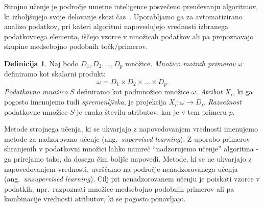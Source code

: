 \documentclass[12pt,a4paper,twoside]{article}
\theoremstyle{definition} %
\newtheorem{definicija}{Definicija}[section]
\theoremstyle{plain} %
\numberwithin{equation}{section}  %
\begin{document}

Strojno učenje je področje umetne inteligence posvečeno preučevanju algoritmov, 
ki izboljšujejo svoje delovanje skozi čas~\cite{hastie2009elements}. %
Uporabljamo ga za avtomatizirano analizo podatkov, pri kateri algoritmi napovedujejo vrednosti izbranega podatkovnega elementa,
iščejo vzorce v množicah podatkov ali pa prepoznavajo skupine medsebojno podobnih točk/primerov. 

\begin{definicija}
	Naj bodo $D_1, D_2, \ldots, D_p$ množice.
	\emph{Množico možnih primerov} $\omega$ definiramo kot skalarni produkt:
	\[
		\omega = D_1 \times D_2 \times \dots \times D_p.
	\]
	\emph{Podatkovno množico} $S$ definiramo kot podmnožico množice $\omega$.
	\emph{Atribut} $X_i$, ki ga pogosto imenujemo tudi \emph{spremenljivka}, je projekcija $X_i : \omega \rightarrow D_i$.
	\emph{Razsežnost} podatkovne množice $S$ je enaka številu atributov, kar je v tem primeru $p$.
\end{definicija}

Metode strojnega učenja, ki se ukvarjajo z napovedovanjem vrednosti imenujemo metode za nadzorovano učenje (ang.~\textsl{supervised learning}). 
Z uporabo primerov shranjenih v podatkovni množici lahko namreč ``nadzorujemo učenje'' algoritma - ga prirejamo tako, da dosega čim boljše napovedi.
Metode, ki se ne ukvarjajo z napovedovanjem vrednosti, uvrščamo na področje nenadzorovanega učenja (ang.~\textsl{unsupervised learning}).
Cilj pri nenadzorovanem učenju je poiskati vzorce v podatkih, npr.\ razpoznati množice medsebojno podobnih primerov ali pa kombinacije vrednosti atributov, ki se pogosto ponavljajo.
\end{document}
